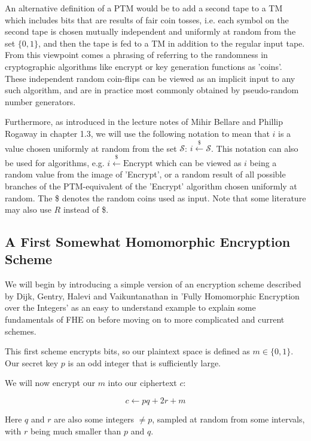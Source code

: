An alternative definition of a PTM would be to add a second tape to a TM which includes bits that are results of fair coin tosses, i.e. each symbol on the second tape is chosen mutually independent and uniformly at random from the set $\{ 0, 1 \}$, and then the tape is fed to a TM in addition to the regular input tape. From this viewpoint comes a phrasing of referring to the randomness in cryptographic algorithms like encrypt or key generation functions as 'coins'. These independent random coin-flips can be viewed as an implicit input to any such algorithm, and are in practice most commonly obtained by pseudo-random number generators.

Furthermore, as introduced in the lecture notes of Mihir Bellare and Phillip Rogaway \cite{bellare_introduction_2005} in chapter 1.3, we will use the following notation to mean that $i$ is a value chosen uniformly at random from the set $\mathcal{S}$: $i \xleftarrow{\$} \mathcal{S}$. This notation can also be used for algorithms, e.g. $i \xleftarrow{\$} \text{Encrypt}$ which can be viewed as $i$ being a random value from the image of 'Encrypt', or a random result of all possible branches of the PTM-equivalent of the 'Encrypt' algorithm chosen uniformly at random. The \$ denotes the random coins used as input. Note that some literature may also use $R$ instead of \$.

\subsection{A First Somewhat Homomorphic Encryption Scheme}

We will begin by introducing a simple version of an encryption scheme described by Dijk, Gentry, Halevi and Vaikuntanathan in 'Fully Homomorphic Encryption over the Integers' \cite{van_dijk_fully_2010} as an easy to understand example to explain some fundamentals of FHE on before moving on to more complicated and current schemes.

This first scheme encrypts bits, so our plaintext space is defined as $m \in \{ 0, 1 \}$. Our secret key $p$ is an odd integer that is sufficiently large.

We will now encrypt our $m$ into our ciphertext $c$:

\begin{equation}
    c \leftarrow p q + 2 r + m
    \label{eq:dijk_encryption}
\end{equation}

Here $q$ and $r$ are also some integers $\neq p$, sampled at random from some intervals, with $r$ being much smaller than $p$ and $q$.


